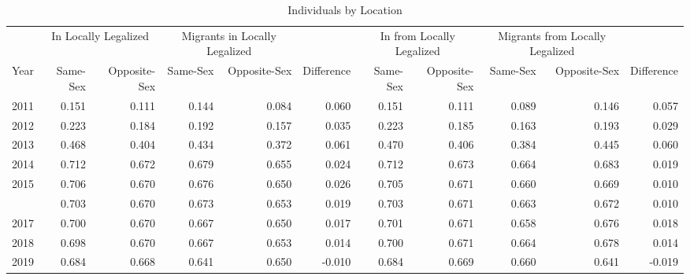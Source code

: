 \begin{table}

\caption{Individuals by Location}
\centering
\begin{tabular}[t]{rrrrrrrrrrr}
\toprule
\multicolumn{1}{c}{ } & \multicolumn{2}{c}{In Locally Legalized} & \multicolumn{2}{c}{Migrants in Locally Legalized} & \multicolumn{1}{c}{ } & \multicolumn{2}{c}{In from Locally Legalized} & \multicolumn{2}{c}{Migrants from Locally Legalized} & \multicolumn{1}{c}{ } \\
\cmidrule(l{3pt}r{3pt}){2-3} \cmidrule(l{3pt}r{3pt}){4-5} \cmidrule(l{3pt}r{3pt}){7-8} \cmidrule(l{3pt}r{3pt}){9-10}
Year & Same-Sex & Opposite-Sex & Same-Sex & Opposite-Sex & Difference & Same-Sex & Opposite-Sex & Same-Sex & Opposite-Sex & Difference\\
\midrule
2011 & 0.151 & 0.111 & 0.144 & 0.084 & 0.060 & 0.151 & 0.111 & 0.089 & 0.146 & 0.057\\
2012 & 0.223 & 0.184 & 0.192 & 0.157 & 0.035 & 0.223 & 0.185 & 0.163 & 0.193 & 0.029\\
2013 & 0.468 & 0.404 & 0.434 & 0.372 & 0.061 & 0.470 & 0.406 & 0.384 & 0.445 & 0.060\\
2014 & 0.712 & 0.672 & 0.679 & 0.655 & 0.024 & 0.712 & 0.673 & 0.664 & 0.683 & 0.019\\
2015 & 0.706 & 0.670 & 0.676 & 0.650 & 0.026 & 0.705 & 0.671 & 0.660 & 0.669 & 0.010\\
\addlinespace
2016 & 0.703 & 0.670 & 0.673 & 0.653 & 0.019 & 0.703 & 0.671 & 0.663 & 0.672 & 0.010\\
2017 & 0.700 & 0.670 & 0.667 & 0.650 & 0.017 & 0.701 & 0.671 & 0.658 & 0.676 & 0.018\\
2018 & 0.698 & 0.670 & 0.667 & 0.653 & 0.014 & 0.700 & 0.671 & 0.664 & 0.678 & 0.014\\
2019 & 0.684 & 0.668 & 0.641 & 0.650 & -0.010 & 0.684 & 0.669 & 0.660 & 0.641 & -0.019\\
\bottomrule
\end{tabular}
\end{table}

